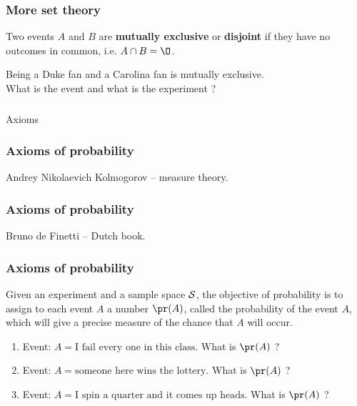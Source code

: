 \begin{frame}[fragile]\frametitle{More set theory}

\begin{defn}
Two events $A$ and $B$ are {\bf mutually exclusive} or {\bf disjoint}
if  they have no outcomes in common, i.e. $A\cap B=\O$.
\end{defn} 

\vspace{.1in}

Being a Duke fan and a Carolina fan is mutually exclusive.\\
What is the event and what is the experiment ?
 
\end{frame}


\begin{frame}[fragile]\frametitle{}
\begin{center}
{\Large Axioms}

\end{center}
\end{frame}





\begin{frame}[fragile]\frametitle{Axioms of probability}

Andrey Nikolaevich Kolmogorov -- measure theory.




\end{frame}


\begin{frame}[fragile]\frametitle{Axioms of probability}

Bruno de Finetti -- Dutch book.



\end{frame}
 

\begin{frame}[fragile]\frametitle{Axioms of probability}


Given an experiment and a sample space $\cal S$, the objective of probability is to assign to each event $A$ a number $\pr(A)$, called the probability of the event $A$, which will give a precise measure of the chance that $A$ will occur. \\ 

\begin{enumerate}

\item Event: $A = \mbox{I fail every one in this class}$.  What is $\pr(A)$ ? 

\item Event: $A = \mbox{someone here wins the lottery}$.  What is $\pr(A)$ ? 

\item Event: $A = \mbox{I spin a quarter and it comes up heads}$.
   What  is $\pr(A)$ ?

\end{enumerate}

\end{frame}

